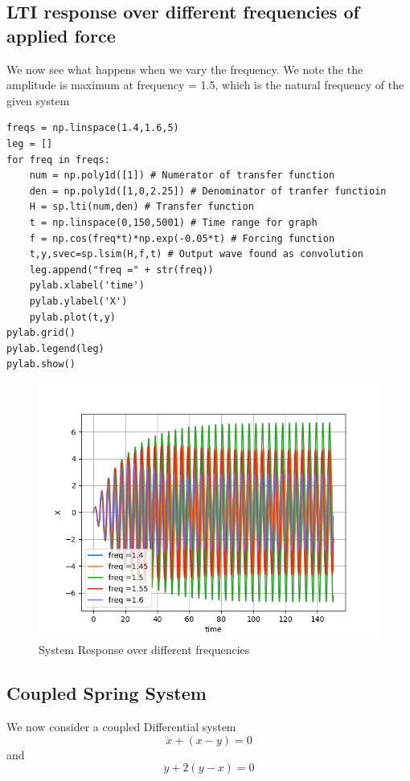 \documentclass{article}
\begin{document}
\subsection{LTI response over different frequencies of applied force}
We now see what happens when we vary the frequency.
We note the the amplitude is maximum at frequency = 1.5, which is the natural frequency of the given system
\begin{lstlisting}
freqs = np.linspace(1.4,1.6,5)
leg = []
for freq in freqs:
	num = np.poly1d([1]) # Numerator of transfer function
	den = np.poly1d([1,0,2.25]) # Denominator of tranfer functioin
	H = sp.lti(num,den) # Transfer function
	t = np.linspace(0,150,5001) # Time range for graph
	f = np.cos(freq*t)*np.exp(-0.05*t) # Forcing function
	t,y,svec=sp.lsim(H,f,t) # Output wave found as convolution
	leg.append("freq =" + str(freq))
	pylab.xlabel('time')
	pylab.ylabel('X')
	pylab.plot(t,y)	
pylab.grid()
pylab.legend(leg)
pylab.show()
\end{lstlisting}

\begin{figure}[h!]
\centering
\includegraphics[scale=0.6]{Figure_2}
\caption{System Response over different frequencies}
\label{fig:System Response over different frequencies}
\end{figure}


\clearpage
\subsection{Coupled Spring System}
We now consider a coupled Differential system
\begin{equation}
    \ddot x + (x-y) = 0
\end{equation}
and 
\begin{equation}
    \ddot y + 2(y-x) = 0
\end{equation}
\end{document}
